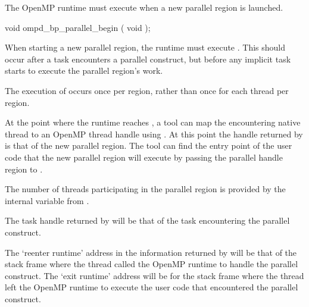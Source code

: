 \summary
The OpenMP runtime must execute %
 when a new parallel region is launched.


\begin{cspecific}
\begin{ompSyntax}
void ompd_bp_parallel_begin ( void );
\end{ompSyntax}
\end{cspecific}


\descr

When starting a new parallel region, the runtime must 
execute .
This should occur after a task encounters a parallel construct,
but before any implicit task starts to execute the parallel
region's work.


The execution of 
occurs once per region, rather than once for each thread per region.

At the point where the runtime reaches ,
a tool can map the encountering native thread to an OpenMP
thread handle using
.
At this point the handle returned by 
is that of the new parallel region.
The tool can find the entry point of the user code that
the new parallel region will execute by passing the parallel handle region
to .

The number of threads participating in the parallel region is provided by
the internal variable  from .

The task handle returned by
will be that of the task encountering the parallel construct.

The `reenter runtime' address in the information returned by
will be that of the stack frame where the thread called the OpenMP
runtime to handle the parallel construct.
The `exit runtime' address will be for the stack frame where the thread
left the OpenMP runtime to execute the user code that encountered
the parallel construct.

%
%

